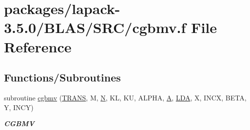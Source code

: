 \hypertarget{lapack-3_85_80_2BLAS_2SRC_2cgbmv_8f}{}\section{packages/lapack-\/3.5.0/\+B\+L\+A\+S/\+S\+R\+C/cgbmv.f File Reference}
\label{lapack-3_85_80_2BLAS_2SRC_2cgbmv_8f}
\subsection*{Functions/\+Subroutines}
\begin{DoxyCompactItemize}
\item 
subroutine \hyperlink{group__complex__blas__level2_ga50fe7a70e7ae8f9ede50acd6747510d7}{cgbmv} (\hyperlink{superlu__enum__consts_8h_a0c4e17b2d5cea33f9991ccc6a6678d62a1f61e3015bfe0f0c2c3fda4c5a0cdf58}{T\+R\+A\+N\+S}, M, \hyperlink{polmisc_8c_a0240ac851181b84ac374872dc5434ee4}{N}, K\+L, K\+U, A\+L\+P\+H\+A, \hyperlink{classA}{A}, \hyperlink{example__user_8c_ae946da542ce0db94dced19b2ecefd1aa}{L\+D\+A}, X, I\+N\+C\+X, B\+E\+T\+A, Y, I\+N\+C\+Y)
\begin{DoxyCompactList}\small\item\em {\bfseries C\+G\+B\+M\+V} \end{DoxyCompactList}\end{DoxyCompactItemize}

